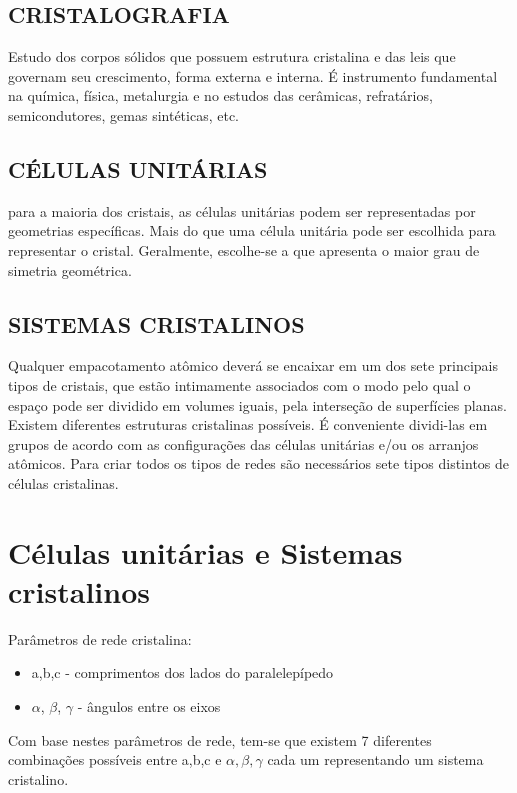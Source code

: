 \subsection*{CRISTALOGRAFIA} Estudo dos corpos sólidos que possuem estrutura cristalina e das leis que governam seu crescimento, forma externa e interna. É instrumento fundamental na química, física, metalurgia e no estudos das cerâmicas, refratários, semicondutores, gemas sintéticas, etc.


\subsection*{CÉLULAS UNITÁRIAS} para a maioria dos cristais, as células unitárias podem ser representadas por geometrias específicas. Mais do que uma célula unitária pode ser escolhida para representar o cristal. Geralmente, escolhe-se a que apresenta o maior grau de simetria geométrica.



\subsection*{SISTEMAS CRISTALINOS} Qualquer empacotamento atômico deverá se encaixar em um dos sete principais tipos de cristais, que estão intimamente associados com o modo pelo qual o espaço pode ser dividido em volumes iguais, pela interseção de superfícies planas.
Existem diferentes estruturas cristalinas possíveis. É conveniente dividi-las em grupos de acordo com as configurações das células unitárias e/ou os arranjos atômicos. Para criar todos os tipos de redes são necessários sete tipos distintos de células cristalinas.


\section{Células unitárias e Sistemas cristalinos}

Parâmetros de rede cristalina:
\begin{itemize}
	\setlength{\parskip}{0pt}
	\setlength{\itemsep}{0pt plus 1pt}
	
	\item a,b,c - comprimentos dos lados do paralelepípedo
	\item $ \alpha$, $\beta$, $\gamma $ - ângulos entre os eixos
\end{itemize}




Com base nestes parâmetros de rede, tem-se que existem 7 diferentes combinações possíveis entre a,b,c e $\alpha, \beta, \gamma $ cada um representando um sistema cristalino.


